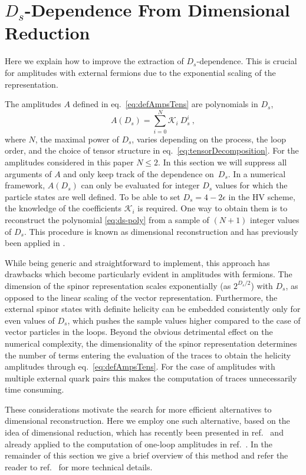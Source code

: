  

\section{$D_s$-Dependence From Dimensional Reduction}
\label{sec:ds_reduction}
Here we explain how to improve the extraction of $D_s$-dependence.
This is crucial for amplitudes with external fermions due to the exponential scaling of the representation.


The amplitudes $A$ defined in eq.~\eqref{eq:defAmpsTens} are polynomials in $D_s$,
\begin{equation}
  A(D_s) = \sum_{i=0}^{N} \mathcal{K}_i~D_s^{i}\ ,
  \label{eq:ds-poly}
\end{equation}
where $N$, the maximal power of $D_s$, 
varies depending on the process, the loop order, and the choice of tensor structure 
in eq.~\eqref{eq:tensorDecomposition}.
For the amplitudes considered in this paper $N\leq2$.
In this section we will suppress all arguments of $A$ and only keep track of the 
dependence on~$D_s$.
%
In a numerical framework, $A(D_s)$ can only be evaluated for integer $D_s$ values for which 
the particle states are well defined.
To be able to set $D_s=4-2\epsilon$ in the HV scheme, the knowledge of the coefficients $\mathcal{K}_i$ is required.
One way to obtain them is to reconstruct the polynomial \eqref{eq:ds-poly} from
a sample of $(N+1)$ integer values of $D_s$.
This procedure is known as dimensional reconstruction \cite{Giele:2008ve} and has  previously been applied
in \cite{Ellis:2008ir,Boughezal:2011br,Abreu:2017xsl,Abreu:2017hqn}.

While being generic and straightforward to implement, this approach has drawbacks which
become particularly evident in amplitudes with fermions.
%
The dimension of the spinor representation scales exponentially (as $2^{D_s/2}$) with $D_s$,
as opposed to the linear scaling of the vector representation.
Furthermore, the external spinor states with definite helicity can be embedded consistently
only for even values of $D_s$,
which pushes the sample values higher compared to the case of vector particles in the loops.
Beyond the obvious detrimental effect on the numerical complexity, the dimensionality of the
spinor representation determines the number of terms entering the evaluation of the traces
to obtain the helicity amplitudes through  eq.~\eqref{eq:defAmpsTens}. For
the case of amplitudes with multiple external quark pairs this makes the computation
of traces unnecessarily time consuming.

These considerations motivate the search for more efficient alternatives to dimensional
reconstruction. Here we employ one such alternative, based on the idea of
dimensional reduction, which has recently been presented in ref.~\cite{Anger:2018ove} 
and already applied to the computation of one-loop amplitudes in ref.~\cite{Anger:2017glm}.
In the remainder of this section we give a brief overview of this method 
and refer the reader to ref.~\cite{Anger:2018ove} for more technical details.

